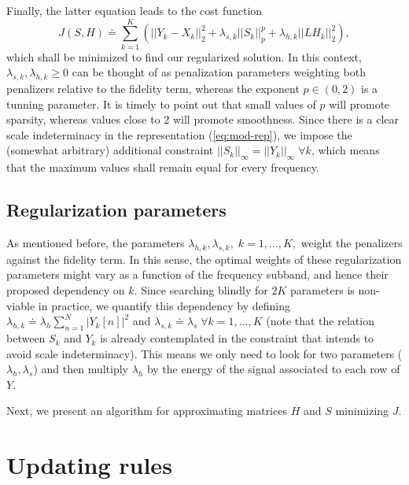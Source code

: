 \documentclass[12pt]{article}
\begin{document}
Finally, the latter equation leads to the cost function
%
\begin{equation} \label{eq:cost-fun}
J(S,H) \doteq \sum_{k=1}^K\left( ||Y_k - X_k||_2^2  +\lambda_{s,k} ||S_k||_p^p + \lambda_{h,k}||LH_k||_2^2 \right),
\end{equation}
%
which shall be minimized to find our regularized solution. In this context,  $\lambda_{s,k}, \lambda_{h,k}\geq 0$ can be thought of as penalization parameters weighting both penalizers relative to the fidelity term, whereas the exponent $p\in (0,2)$ is a tunning parameter. It is timely to point out that small values of $p$ will promote sparsity, whereas values close to $2$ will promote smoothness. Since there is a clear scale indeterminacy in  the representation (\ref{eq:mod-rep}), we impose the (somewhat arbitrary) additional constraint $||S_k||_\infty=||Y_k||_\infty\;\forall k$, which means that the maximum values shall remain equal for every frequency.



\subsection{Regularization parameters}

As mentioned before, the parameters $\lambda_{h,k}, \lambda_{s,k},\; k=1,\ldots, K,$ weight the penalizers against the fidelity term. In this sense, the optimal weights of these regularization parameters might vary as a function of the frequency subband, and hence their proposed dependency on $k$. Since searching blindly for $2K$ parameters is non-viable in practice, we quantify this dependency by defining $\lambda_{h,k} \doteq \lambda_{h}\sum_{n=1}^N|Y_k[n]|^2$ and $\lambda_{s,k} \doteq \lambda_{s} \; \forall k = 1,\ldots,K$ (note that the relation between $S_k$ and $Y_k$ is already contemplated in the constraint that intends to avoid scale indeterminacy). This means we only need to look for two parameters ($\lambda_h, \lambda_s$) and then multiply $\lambda_{h}$ by the energy of the signal associated to each row of $Y$.

Next, we present an algorithm for approximating matrices $H$ and $S$ minimizing $J$.




\section{Updating rules}
\end{document}
